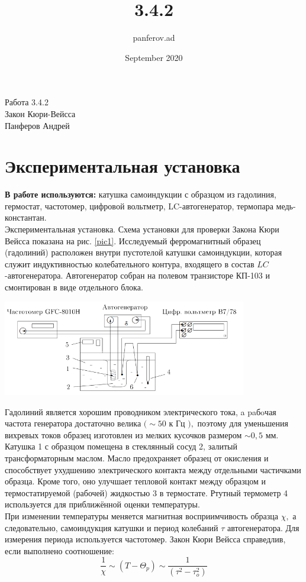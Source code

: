 \documentclass[12pt]{article}
\title{3.4.2}
\author{panferov.ad }
\date{September 2020}
\begin{document}
\begin{center}
  \LARGE{Работа 3.4.2}\\[0.2cm]
  \LARGE{Закон Кюри-Вейсса}\\[0.2cm]
  \large{Панферов Андрей}\\[0.2cm]
\end{center}

\section{Экспериментальная установка}
\textbf{В работе используются:} катушка самоиндукции с образцом из гадолиния, гермостат, частотомер, цифровой вольтметр, LC-автогенератор, термопара медь-константан.\\

Экспериментальная установка. Схема установки для проверки Закона Кюри Вейсса показана на рис. \ref{pic1}. Исследуемый ферромагнитный образец (гадолиний) расположен внутри пустотелой катушки самоиндукции, которая служит индуктивностью колебательного контура, входящего в состав $L C$ -автогенератора. Автогенератор собран на полевом транзисторе КП-103 и смонтирован в виде отдельного блока.

\begin{center}
    \includegraphics[width=0.8\textwidth]{1.png}
    \label{pic1}
\end{center}

Гадолиний является хорошим проводником электрического тока, a paбoчая частота генератора достаточно велика $(\sim 50$ к Гц $),$ поэтому для уменьшения вихревых токов образец изготовлен из мелких кусочков размером $\sim 0,5$ мм. Катушка 1 с образцом помещена в стеклянный сосуд 2, залитый трансформаторным маслом. Масло предохраняет образец от окисления и способствует
ухудшению электрического контакта между отдельными частичками образца. Кроме того, оно улучшает тепловой контакт между образцом и термостатируемой (рабочей) жидкостью 3 в термостате. Ртутный термометр 4 используется для приближённой оценки температуры.\\
При изменении температуры меняется магнитная восприимчивость образца $\chi,$ а следовательно, самоиндукция катушки и период колебаний $\tau$ автогенератора. Для измерения периода используется частотомер.
Закон Кюри Вейсса справедлив, если выполнено соотношение: 
\begin{equation*}
\frac{1}{\chi} \sim\left(T-\Theta_{p}\right) \sim \frac{1}{\left(\tau^{2}-\tau_{o}^{2}\right)}
\end{equation*}
\end{document}
